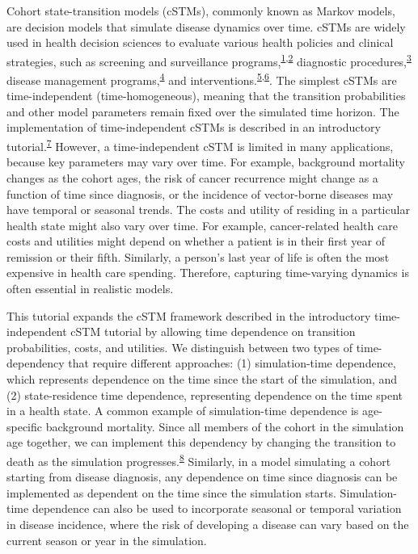 \documentclass[
]{article}
\begin{document}
Cohort state-transition models (cSTMs), commonly known as Markov models, are decision models that simulate disease dynamics over time. cSTMs are widely used in health decision sciences to evaluate various health policies and clinical strategies, such as screening and surveillance programs,\textsuperscript{\protect\hyperlink{ref-Suijkerbuijk2018}{1},\protect\hyperlink{ref-Sathianathen2018a}{2}} diagnostic procedures,\textsuperscript{\protect\hyperlink{ref-Lu2018b}{3}} disease management programs,\textsuperscript{\protect\hyperlink{ref-Djatche2018}{4}} and interventions.\textsuperscript{\protect\hyperlink{ref-Pershing2014}{5},\protect\hyperlink{ref-Smith-Spangler2010}{6}}. The simplest cSTMs are time-independent (time-homogeneous), meaning that the transition probabilities and other model parameters remain fixed over the simulated time horizon. The implementation of time-independent cSTMs is described in an introductory tutorial.\textsuperscript{\protect\hyperlink{ref-Alarid-Escudero2022b}{7}} However, a time-independent cSTM is limited in many applications, because key parameters may vary over time. For example, background mortality changes as the cohort ages, the risk of cancer recurrence might change as a function of time since diagnosis, or the incidence of vector-borne diseases may have temporal or seasonal trends. The costs and utility of residing in a particular health state might also vary over time. For example, cancer-related health care costs and utilities might depend on whether a patient is in their first year of remission or their fifth. Similarly, a person's last year of life is often the most expensive in health care spending. Therefore, capturing time-varying dynamics is often essential in realistic models.

This tutorial expands the cSTM framework described in the introductory time-independent cSTM tutorial by allowing time dependence on transition probabilities, costs, and utilities. We distinguish between two types of time-dependency that require different approaches: (1) simulation-time dependence, which represents dependence on the time since the start of the simulation, and (2) state-residence time dependence, representing dependence on the time spent in a health state. A common example of simulation-time dependence is age-specific background mortality. Since all members of the cohort in the simulation age together, we can implement this dependency by changing the transition to death as the simulation progresses.\textsuperscript{\protect\hyperlink{ref-Snowsill2019}{8}} Similarly, in a model simulating a cohort starting from disease diagnosis, any dependence on time since diagnosis can be implemented as dependent on the time since the simulation starts. Simulation-time dependence can also be used to incorporate seasonal or temporal variation in disease incidence, where the risk of developing a disease can vary based on the current season or year in the simulation.
\end{document}

